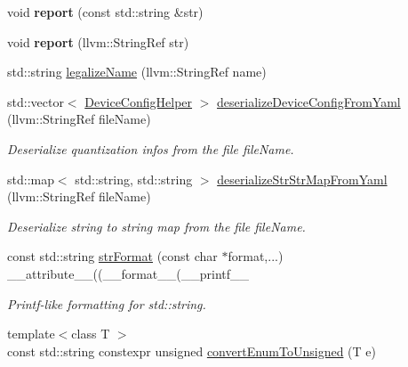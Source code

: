 \begin{DoxyCompactItemize}
void {\bfseries report} (const std\+::string \&str)
\item 
\mbox{\label{namespaceglow_a9318e385e95e64e916620a62ee3310d3}} 
void {\bfseries report} (llvm\+::\+String\+Ref str)
\item 
std\+::string \hyperlink{namespaceglow_aa2799bdee5e14247b8699a8dfd8f6ae9}{legalize\+Name} (llvm\+::\+String\+Ref name)
\item 
\mbox{\label{namespaceglow_ab661c0cc5604b2acbbf8194bae5979ed}} 
std\+::vector$<$ \hyperlink{structglow_1_1_device_config_helper}{Device\+Config\+Helper} $>$ \hyperlink{namespaceglow_ab661c0cc5604b2acbbf8194bae5979ed}{deserialize\+Device\+Config\+From\+Yaml} (llvm\+::\+String\+Ref file\+Name)
\begin{DoxyCompactList}\small\item\em Deserialize quantization infos from the file {\ttfamily file\+Name}. \end{DoxyCompactList}\item 
\mbox{\label{namespaceglow_a38ec6a162752e477489d4c5cbff6be28}} 
std\+::map$<$ std\+::string, std\+::string $>$ \hyperlink{namespaceglow_a38ec6a162752e477489d4c5cbff6be28}{deserialize\+Str\+Str\+Map\+From\+Yaml} (llvm\+::\+String\+Ref file\+Name)
\begin{DoxyCompactList}\small\item\em Deserialize string to string map from the file {\ttfamily file\+Name}. \end{DoxyCompactList}\item 
\mbox{\label{namespaceglow_a6d8dd211016444e5c6014f63452c1a8a}} 
const std\+::string \hyperlink{namespaceglow_a6d8dd211016444e5c6014f63452c1a8a}{str\+Format} (const char $\ast$format,...) \+\_\+\+\_\+attribute\+\_\+\+\_\+((\+\_\+\+\_\+format\+\_\+\+\_\+(\+\_\+\+\_\+printf\+\_\+\+\_\+
\begin{DoxyCompactList}\small\item\em Printf-\/like formatting for std\+::string. \end{DoxyCompactList}\item 
{\footnotesize template$<$class T $>$ }\\const std\+::string constexpr unsigned \hyperlink{namespaceglow_ab2669a16ac3c54145c294457d6554cb4}{convert\+Enum\+To\+Unsigned} (T e)
\item 

\end{DoxyCompactItemize}
